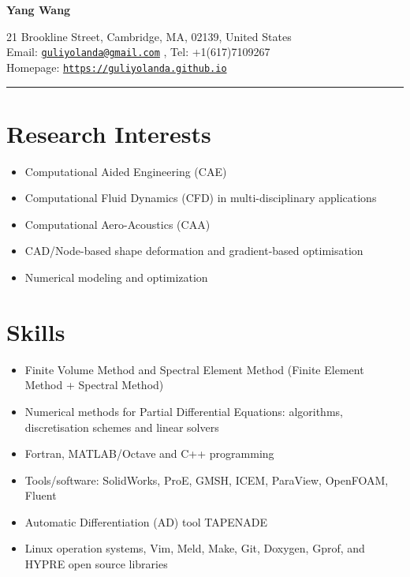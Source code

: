 \documentclass[letterpaper]{article}
\def\name{Yang Wang}
\begin{document}

\centerline{\LARGE \bf \name}


\begin{minipage}{\linewidth}
\begin{center}
21 Brookline Street, Cambridge, MA, 02139, United States\\
Email: \href{mailto:guliyolanda@gmail.com}{\tt guliyolanda@gmail.com} , Tel: +1(617)7109267 \\
Homepage:  \href{https://guliyolanda.github.io}{\tt https://guliyolanda.github.io} \\
\end{center}
\end{minipage}

\vspace{0pt}
\rule{\textwidth}{1pt}

\vspace{-12pt}
\section*{Research Interests}
\vspace{-10pt}
\begin{itemize}
\item Computational Aided Engineering (CAE)
\item Computational Fluid Dynamics (CFD) in multi-disciplinary applications
\item Computational Aero-Acoustics (CAA)
\item CAD/Node-based shape deformation and gradient-based optimisation
\item Numerical modeling and optimization
\end{itemize} 

\vspace{-12pt}
\section*{Skills}
\vspace{-10pt}
\begin{itemize}
\item Finite Volume Method and Spectral Element Method (Finite Element Method + Spectral Method)
\item Numerical methods for Partial Differential Equations: algorithms, discretisation schemes and linear solvers
\item Fortran, MATLAB/Octave and C++ programming
\item Tools/software: SolidWorks, ProE, GMSH, ICEM, ParaView, OpenFOAM, Fluent
\item Automatic Differentiation (AD) tool TAPENADE
\item Linux operation systems, Vim, Meld, Make, Git, Doxygen, Gprof, and HYPRE open source libraries 
\end{itemize}
\end{document}
